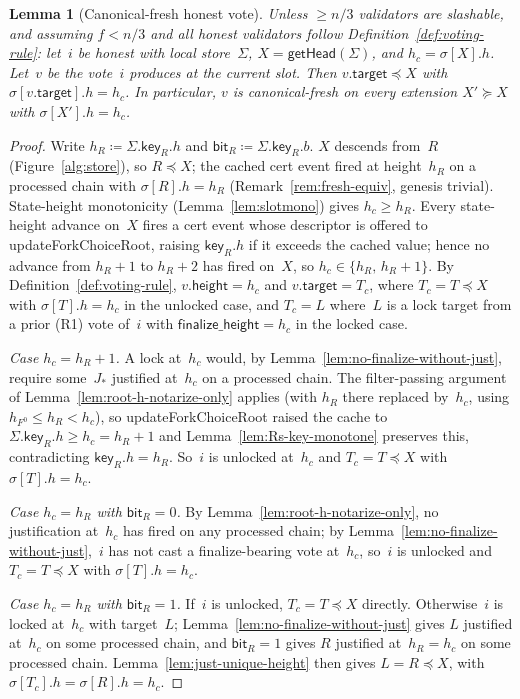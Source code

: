 \documentclass{article}
\newcommand{\target}{\mathsf{target}}
\newcommand{\height}{\mathsf{height}}
\newcommand{\finalizeHeight}{\mathsf{finalize\_height}}
\newcommand{\key}{\mathsf{key}}
\newcommand{\bit}{\mathsf{bit}}
\newcommand{\updateForkChoiceRoot}{\textsf{updateForkChoiceRoot}\xspace}
\newcommand{\getHead}{\textsf{getHead}\xspace}
\theoremstyle{plain}
\newtheorem{lemma}{Lemma}
\theoremstyle{definition}
\theoremstyle{remark}
\begin{document}
\begin{lemma}[Canonical-fresh honest vote]\label{lem:canonical-fresh-honest-vote}
Unless $\geq n/3$ validators are slashable, and assuming $f < n/3$ and all honest validators follow Definition~\ref{def:voting-rule}: let~$i$ be honest with local store~$\Sigma$, $X = \getHead(\Sigma)$, and $h_c = \sigma[X].h$.
Let~$v$ be the vote~$i$ produces at the current slot.
Then $v.\target \preceq X$ with $\sigma[v.\target].h = h_c$.
In particular, $v$ is canonical-fresh on every extension $X' \succeq X$ with $\sigma[X'].h = h_c$.
\end{lemma}

\begin{proof}
Write $h_R \coloneqq \Sigma.\key_R.h$ and $\bit_R \coloneqq \Sigma.\key_R.b$.
$X$ descends from~$R$ (Figure~\ref{alg:store}), so $R \preceq X$; the cached cert event fired at height~$h_R$ on a processed chain with $\sigma[R].h = h_R$ (Remark~\ref{rem:fresh-equiv}, genesis trivial).
State-height monotonicity (Lemma~\ref{lem:slotmono}) gives $h_c \geq h_R$.
Every state-height advance on~$X$ fires a cert event whose descriptor is offered to \updateForkChoiceRoot, raising $\key_R.h$ if it exceeds the cached value; hence no advance from $h_R + 1$ to $h_R + 2$ has fired on~$X$, so $h_c \in \{h_R,\, h_R + 1\}$.
By Definition~\ref{def:voting-rule}, $v.\height = h_c$ and $v.\target = T_c$, where $T_c = T \preceq X$ with $\sigma[T].h = h_c$ in the unlocked case, and $T_c = L$ where~$L$ is a lock target from a prior (R1) vote of~$i$ with $\finalizeHeight = h_c$ in the locked case.

\emph{Case $h_c = h_R + 1$.}
A lock at~$h_c$ would, by Lemma~\ref{lem:no-finalize-without-just}, require some~$J_\ast$ justified at~$h_c$ on a processed chain.
The filter-passing argument of Lemma~\ref{lem:root-h-notarize-only} applies (with $h_R$ there replaced by~$h_c$, using $h_{F^0} \leq h_R < h_c$), so \updateForkChoiceRoot raised the cache to $\Sigma.\key_R.h \geq h_c = h_R + 1$ and Lemma~\ref{lem:Rs-key-monotone} preserves this, contradicting $\key_R.h = h_R$.
So~$i$ is unlocked at~$h_c$ and $T_c = T \preceq X$ with $\sigma[T].h = h_c$.

\emph{Case $h_c = h_R$ with $\bit_R = 0$.}
By Lemma~\ref{lem:root-h-notarize-only}, no justification at~$h_c$ has fired on any processed chain; by Lemma~\ref{lem:no-finalize-without-just},~$i$ has not cast a finalize-bearing vote at~$h_c$, so~$i$ is unlocked and $T_c = T \preceq X$ with $\sigma[T].h = h_c$.

\emph{Case $h_c = h_R$ with $\bit_R = 1$.}
If~$i$ is unlocked, $T_c = T \preceq X$ directly.
Otherwise~$i$ is locked at~$h_c$ with target~$L$; Lemma~\ref{lem:no-finalize-without-just} gives $L$ justified at~$h_c$ on some processed chain, and $\bit_R = 1$ gives $R$ justified at~$h_R = h_c$ on some processed chain.
Lemma~\ref{lem:just-unique-height} then gives $L = R \preceq X$, with $\sigma[T_c].h = \sigma[R].h = h_c$.
\end{proof}
\end{document}
